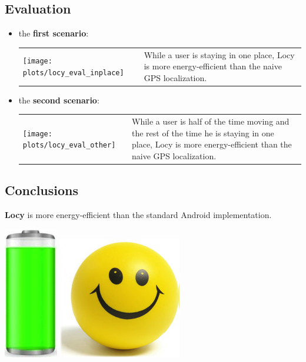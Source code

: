 \documentclass[a2,landscape]{a0poster}
\begin{document}
\mbox{}\framebreak
\begin{center}
\section*{Evaluation}
\end{center}
\begin{itemize}
   \item the \textbf{first scenario}:

\begin{tabular}[t]{p{8.0cm} p{8.0cm}}
       \vspace{0cm}\texttt{[image: plots/locy\_eval\_inplace]} &  \vspace{0cm}While a user is staying in one place, Locy is more energy-efficient than the naive GPS localization.
      \end{tabular}

   \item the \textbf{second scenario}:

\begin{tabular}[t]{p{8.0cm} p{8.0cm}}
	\vspace{0cm}\texttt{[image: plots/locy\_eval\_other]} &  \vspace{0cm}While a user is half of the time moving and the rest of the time he is staying in one place, Locy is more energy-efficient than the naive GPS localization.
\end{tabular}
  \end{itemize}

\begin{center}
\section*{Conclusions}
\end{center}

\textbf{Locy} is more energy-efficient than the standard Android implementation. 
\begin{center}
\includegraphics[scale=0.7]{plots/full_battery}
\includegraphics[scale=0.7]{plots/happy_face}
\end{center}
\end{document}
